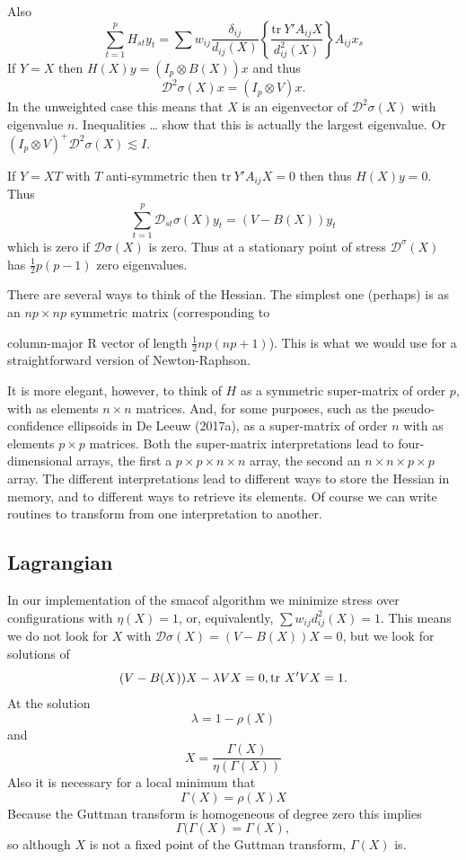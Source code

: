 \documentclass[
  12pt,
]{article}
\begin{document}
Also \[
\sum_{t=1}^p H_{st}y_t=\sum w_{ij}\frac{\delta_{ij}}{d_{ij}(X)}\left\{\frac{\text{tr}\ Y'A_{ij}X }{d_{ij}^2(X)}\right\}A_{ij}x_s
\] If \(Y=X\) then \(H(X)y=(I_p\otimes B(X))x\) and thus
\[\mathcal{D}^2\sigma(X)x=(I_p\otimes V)x.\] In the unweighted case this
means that \(X\) is an eigenvector of \(\mathcal{D}^2\sigma(X)\) with
eigenvalue \(n\). Inequalities \ldots{} show that this is actually the largest
eigenvalue. Or \((I_p\otimes V)^+\mathcal{D}^2\sigma(X)\lesssim I\).

If \(Y=XT\) with \(T\) anti-symmetric then \(\text{tr}\ Y'A_{ij}X=0\) then
thus \(H(X)y=0\). Thus \[
\sum_{t=1}^p\mathcal{D}_{st}\sigma(X)y_t=(V-B(X))y_t
\] which is zero if \(\mathcal{D}\sigma(X)\) is zero. Thus at a stationary
point of stress \(\mathcal{D}^\sigma(X)\) has \(\frac12p(p-1)\) zero
eigenvalues.

There are several ways to think of the Hessian. The simplest one
(perhaps) is as an \(np\times np\) symmetric matrix (corresponding to

column-major R vector of length \(\frac12 np(np+1)\)). This is what we
would use for a straightforward version of Newton-Raphson.

It is more elegant, however, to think of \(H\) as a symmetric super-matrix
of order \(p\), with as elements \(n\times n\) matrices. And, for some
purposes, such as the pseudo-confidence ellipsoids in De Leeuw (2017a), as
a super-matrix of order \(n\) with as elements \(p\times p\) matrices. Both
the super-matrix interpretations lead to four-dimensional arrays, the
first a \(p\times p\times n\times n\) array, the second an
\(n\times n\times p\times p\) array. The different interpretations lead to
different ways to store the Hessian in memory, and to different ways to
retrieve its elements. Of course we can write routines to transform from
one interpretation to another.

\subsection{Lagrangian}\label{lagrangian}

In our implementation of the smacof algorithm we minimize stress over
configurations with \(\eta(X)=1\), or, equivalently,
\(\sum w_{ij}d_{ij}^2(X)=1\). This means we do not look for \(X\) with
\(\mathcal{D}\sigma(X)=(V-B(X))X=0\), but we look for solutions of \[
(V-B(X))X-\lambda VX=0,\\
\text{tr}\ X'VX= 1.
\] At the solution \[
\lambda=1-\rho(X)
\] and \[
X = \frac{\Gamma(X)}{\eta(\Gamma(X))}
\] Also it is necessary for a local minimum that \[
\Gamma(X)=\rho(X)X
\] Because the Guttman transform is homogeneous of degree zero this
implies \[
\Gamma(\Gamma(X)=\Gamma(X),
\] so although \(X\) is not a fixed point of the Guttman transform,
\(\Gamma(X)\) is.
\end{document}
